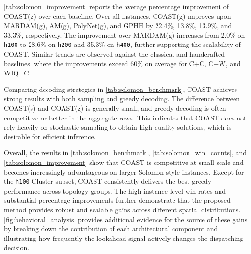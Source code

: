 \documentclass[conference]{IEEEtran}
\begin{document}
\autoref{tab:solomon_improvement} reports the average percentage improvement of COAST(g) over each baseline. Over all instances, COAST(g) improves upon MARDAM(g), AM(g), PolyNet(g), and GPHH by 22.4\%, 13.8\%, 13.9\%, and 33.3\%, respectively. The improvement over MARDAM(g) increases from 2.0\% on \texttt{h100} to 28.6\% on \texttt{h200} and 35.3\% on \texttt{h400}, further supporting the scalability of COAST. Similar trends are observed against the classical and handcrafted baselines, where the improvements exceed 60\% on average for C+C, C+W, and WIQ+C.

Comparing decoding strategies in \autoref{tab:solomon_benchmark}, COAST achieves strong results with both sampling and greedy decoding. The difference between COAST(s) and COAST(g) is generally small, and greedy decoding is often competitive or better in the aggregate rows. This indicates that COAST does not rely heavily on stochastic sampling to obtain high-quality solutions, which is desirable for efficient inference.

Overall, the results in \autoref{tab:solomon_benchmark}, \autoref{tab:solomon_win_counts}, and \autoref{tab:solomon_improvement} show that COAST is competitive at small scale and becomes increasingly advantageous on larger Solomon-style instances. Except for the \texttt{h100} Cluster subset, COAST consistently delivers the best greedy performance across topology groups. The high instance-level win rates and substantial percentage improvements further demonstrate that the proposed method provides robust and scalable gains across different spatial distributions. \autoref{fig:behavioral_analysis} provides additional evidence for the source of these gains by breaking down the contribution of each architectural component and illustrating how frequently the lookahead signal actively changes the dispatching decision.
\end{document}
